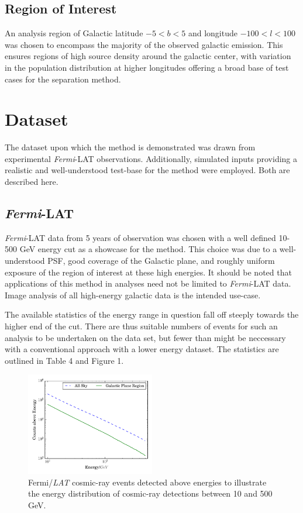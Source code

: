 \documentclass{PoS}
\begin{document}
\subsection{Region of Interest}

An analysis region of Galactic latitude $-5 < b < 5$ and longitude $-100 < l < 100$ was chosen to encompass the majority of the observed galactic emission. This ensures regions of high source density around the galactic center, with variation in the population distribution at higher longitudes offering a broad base of test cases for the separation method.


\section{Dataset}

The dataset upon which the method is demonstrated was drawn from experimental \textit{Fermi}-LAT observations. Additionally, simulated inputs providing a realistic and well-understood test-base for the method were employed. Both are described here.

\subsection{\textit{Fermi}-LAT}

\textit{Fermi}-LAT data from 5 years of observation was chosen with a well defined 10-500 GeV energy cut as a showcase for the method. This choice was due to a well-understood PSF, good coverage of the Galactic plane, and roughly uniform exposure of the region of interest at these high energies. It should be noted that applications of this method in analyses need not be limited to \textit{Fermi}-LAT data. Image analysis of all high-energy galactic data is the intended use-case.

The available statistics of the energy range in question fall off steeply towards the higher end of the cut. There are thus suitable numbers of events for such an analysis to be undertaken on the data set, but fewer than might be neccessary with a conventional approach with a lower energy dataset. The statistics are outlined in Table 4 and Figure 1.

\begin{figure}
  \begin{center}
      \includegraphics[width=0.5\textwidth]{figures/counts.pdf}
  \caption{Fermi/\textit{LAT} cosmic-ray events detected above energies to illustrate the energy distribution of cosmic-ray detections between 10 and 500 GeV.}
  \end{center}
\end{figure}
\end{document}
